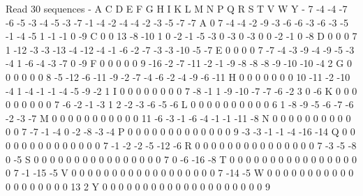 Read 30 sequences
 	 -	 A	 C	 D	 E	 F	 G	 H	 I	 K	 L	 M	 N	 P	 Q	 R	 S	 T	 V	 W	 Y
-	 7	 -4	 -4	 -7	 -6	 -5	 -3	 -4	 -5	 -3	 -7	 -1	 -4	 -2	 -4	 -4	 -2	 -3	 -5	 -7	 -7
A	 0	 7	 -4	 -4	 -2	 -9	 -3	 -6	 -6	 -3	 -6	 -3	 -5	 -1	 -4	 -5	 1	 -1	 -1	 0	 -9
C	 0	 0	 13	 -8	 -10	 1	 0	 -2	 -1	 -5	 -3	 0	 -3	 0	 -3	 0	 0	 -2	 -1	 0	 -8
D	 0	 0	 0	 7	 1	 -12	 -3	 -3	 -13	 -4	 -12	 -4	 -1	 -6	 -2	 -7	 -3	 -3	 -10	 -5	 -7
E	 0	 0	 0	 0	 7	 -7	 -4	 -3	 -9	 -4	 -9	 -5	 -3	 -4	 1	 -6	 -4	 -3	 -7	 0	 -9
F	 0	 0	 0	 0	 0	 9	 -16	 -2	 -7	 -11	 -2	 -1	 -9	 -8	 -8	 -8	 -9	 -10	 -10	 -4	 2
G	 0	 0	 0	 0	 0	 0	 8	 -5	 -12	 -6	 -11	 -9	 -2	 -7	 -4	 -6	 -2	 -4	 -9	 -6	 -11
H	 0	 0	 0	 0	 0	 0	 0	 10	 -11	 -2	 -10	 -4	 1	 -4	 -1	 -1	 -4	 -5	 -9	 -2	 1
I	 0	 0	 0	 0	 0	 0	 0	 0	 7	 -8	 -1	 1	 -9	 -10	 -7	 -7	 -6	 -2	 3	 0	 -6
K	 0	 0	 0	 0	 0	 0	 0	 0	 0	 7	 -6	 -2	 -1	 -3	 1	 2	 -2	 -3	 -6	 -5	 -6
L	 0	 0	 0	 0	 0	 0	 0	 0	 0	 0	 6	 1	 -8	 -9	 -5	 -6	 -7	 -6	 -2	 -3	 -7
M	 0	 0	 0	 0	 0	 0	 0	 0	 0	 0	 0	 11	 -6	 -3	 -1	 -6	 -4	 -1	 -1	 -11	 -8
N	 0	 0	 0	 0	 0	 0	 0	 0	 0	 0	 0	 0	 7	 -7	 -1	 -4	 0	 -2	 -8	 -3	 -4
P	 0	 0	 0	 0	 0	 0	 0	 0	 0	 0	 0	 0	 0	 9	 -3	 -3	 -1	 -1	 -4	 -16	 -14
Q	 0	 0	 0	 0	 0	 0	 0	 0	 0	 0	 0	 0	 0	 0	 7	 -1	 -2	 -2	 -5	 -12	 -6
R	 0	 0	 0	 0	 0	 0	 0	 0	 0	 0	 0	 0	 0	 0	 0	 7	 -3	 -5	 -8	 0	 -5
S	 0	 0	 0	 0	 0	 0	 0	 0	 0	 0	 0	 0	 0	 0	 0	 0	 7	 0	 -6	 -16	 -8
T	 0	 0	 0	 0	 0	 0	 0	 0	 0	 0	 0	 0	 0	 0	 0	 0	 0	 7	 -1	 -15	 -5
V	 0	 0	 0	 0	 0	 0	 0	 0	 0	 0	 0	 0	 0	 0	 0	 0	 0	 0	 7	 -14	 -5
W	 0	 0	 0	 0	 0	 0	 0	 0	 0	 0	 0	 0	 0	 0	 0	 0	 0	 0	 0	 13	 2
Y	 0	 0	 0	 0	 0	 0	 0	 0	 0	 0	 0	 0	 0	 0	 0	 0	 0	 0	 0	 0	 9
